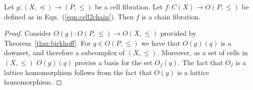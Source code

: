 \begin{prop}
Let $g:(X,\preceq)\to (P,\leq)$ be a cell fibration.  Let $f:C(X)\to O(P,\leq)$ be defined as in Eqn.~(\ref{eqn:cell2chain}).  Then $f$ is a chain fibration.
\end{prop}
\begin{proof}
Consider $O(g):O(P,\leq)\to O(X,\leq)$ provided by Theorem~\ref{thm:birkhoff}. For $q\in O(P,\leq)$ we have that $O(g)(q)$ is a downset, and therefore a subcomplex of $(X,\leq)$.  Moreover, as a set of cells in $(X,\leq)$ $O(g)(q)$ provies a basis for the set $O_f(q)$.  The fact that $O_f$ is a lattice homomorphism follows from the fact that $O(g)$ is a lattice homomorphism.

\end{proof}

%
%
%
%
%
%
%
%
